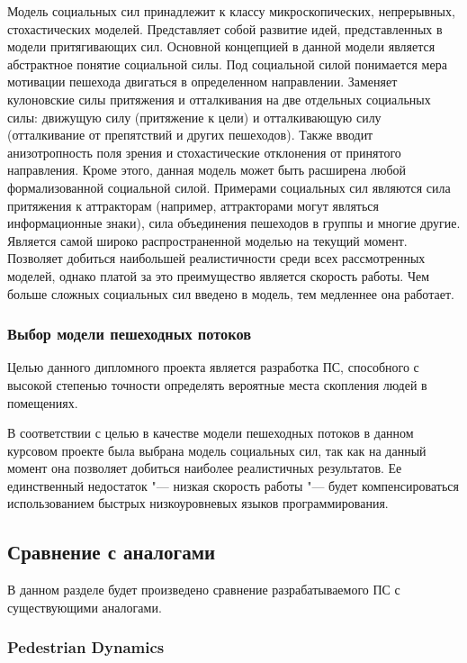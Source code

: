 Модель социальных сил принадлежит к классу микроскопических, непрерывных, стохастических моделей.
Представляет собой развитие идей, представленных в модели притягивающих сил.
Основной концепцией в данной модели является абстрактное понятие социальной силы. Под социальной силой понимается мера мотивации пешехода двигаться в определенном направлении.
Заменяет кулоновские силы притяжения и отталкивания на две отдельных социальных силы: движущую силу (притяжение к цели) и отталкивающую силу (отталкивание от препятствий и других пешеходов).
Также вводит анизотропность поля зрения и стохастические отклонения от принятого направления.
Кроме этого, данная модель может быть расширена любой формализованной социальной силой.
Примерами социальных сил являются сила притяжения к аттракторам (например, аттракторами могут являться информационные знаки), сила объединения пешеходов в группы и многие другие.
Является самой широко распространенной моделью на текущий момент.
Позволяет добиться наибольшей реалистичности среди всех рассмотренных моделей, однако платой за это преимущество является скорость работы.
Чем больше сложных социальных сил введено в модель, тем медленнее она работает.

\subsubsection{Выбор модели пешеходных потоков}
\label{sec:model:choice}

Целью данного дипломного проекта является разработка ПС, способного с высокой степенью точности определять вероятные места скопления людей в помещениях.

В соответствии с целью в качестве модели пешеходных потоков в данном курсовом проекте была выбрана модель социальных сил,
так как на данный момент она позволяет добиться наиболее реалистичных результатов.
Ее единственный недостаток "--- низкая скорость работы "--- будет компенсироваться использованием быстрых низкоуровневых языков программирования.

\subsection{Сравнение с аналогами}
\label{sub:domain:analogs}

В данном разделе будет произведено сравнение разрабатываемого ПС с существующими аналогами.

\subsubsection{Pedestrian Dynamics}
\label{sub:domain:analogs:pd}

